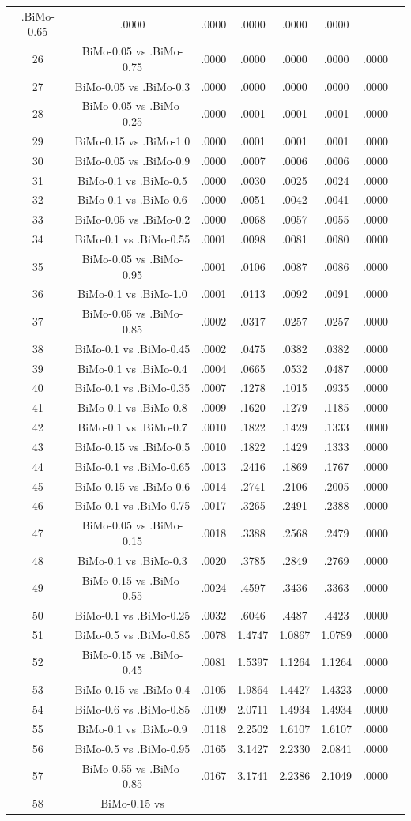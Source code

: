 \documentclass[a4paper,10pt]{article}
\begin{document}
\begin{landscape}
\begin{table}[!htp]
\begin{tabular}{cccccccc}
.BiMo-0.65&.0000&.0000&.0000&.0000&.0000\\26&BiMo-0.05 vs .BiMo-0.75&.0000&.0000&.0000&.0000&.0000\\27&BiMo-0.05 vs .BiMo-0.3&.0000&.0000&.0000&.0000&.0000\\28&BiMo-0.05 vs .BiMo-0.25&.0000&.0001&.0001&.0001&.0000\\29&BiMo-0.15 vs .BiMo-1.0&.0000&.0001&.0001&.0001&.0000\\30&BiMo-0.05 vs .BiMo-0.9&.0000&.0007&.0006&.0006&.0000\\31&BiMo-0.1 vs .BiMo-0.5&.0000&.0030&.0025&.0024&.0000\\32&BiMo-0.1 vs .BiMo-0.6&.0000&.0051&.0042&.0041&.0000\\33&BiMo-0.05 vs .BiMo-0.2&.0000&.0068&.0057&.0055&.0000\\34&BiMo-0.1 vs .BiMo-0.55&.0001&.0098&.0081&.0080&.0000\\35&BiMo-0.05 vs .BiMo-0.95&.0001&.0106&.0087&.0086&.0000\\36&BiMo-0.1 vs .BiMo-1.0&.0001&.0113&.0092&.0091&.0000\\37&BiMo-0.05 vs .BiMo-0.85&.0002&.0317&.0257&.0257&.0000\\38&BiMo-0.1 vs .BiMo-0.45&.0002&.0475&.0382&.0382&.0000\\39&BiMo-0.1 vs .BiMo-0.4&.0004&.0665&.0532&.0487&.0000\\40&BiMo-0.1 vs .BiMo-0.35&.0007&.1278&.1015&.0935&.0000\\41&BiMo-0.1 vs .BiMo-0.8&.0009&.1620&.1279&.1185&.0000\\42&BiMo-0.1 vs .BiMo-0.7&.0010&.1822&.1429&.1333&.0000\\43&BiMo-0.15 vs .BiMo-0.5&.0010&.1822&.1429&.1333&.0000\\44&BiMo-0.1 vs .BiMo-0.65&.0013&.2416&.1869&.1767&.0000\\45&BiMo-0.15 vs .BiMo-0.6&.0014&.2741&.2106&.2005&.0000\\46&BiMo-0.1 vs .BiMo-0.75&.0017&.3265&.2491&.2388&.0000\\47&BiMo-0.05 vs .BiMo-0.15&.0018&.3388&.2568&.2479&.0000\\48&BiMo-0.1 vs .BiMo-0.3&.0020&.3785&.2849&.2769&.0000\\49&BiMo-0.15 vs .BiMo-0.55&.0024&.4597&.3436&.3363&.0000\\50&BiMo-0.1 vs .BiMo-0.25&.0032&.6046&.4487&.4423&.0000\\51&BiMo-0.5 vs .BiMo-0.85&.0078&1.4747&1.0867&1.0789&.0000\\52&BiMo-0.15 vs .BiMo-0.45&.0081&1.5397&1.1264&1.1264&.0000\\53&BiMo-0.15 vs .BiMo-0.4&.0105&1.9864&1.4427&1.4323&.0000\\54&BiMo-0.6 vs .BiMo-0.85&.0109&2.0711&1.4934&1.4934&.0000\\55&BiMo-0.1 vs .BiMo-0.9&.0118&2.2502&1.6107&1.6107&.0000\\56&BiMo-0.5 vs .BiMo-0.95&.0165&3.1427&2.2330&2.0841&.0000\\57&BiMo-0.55 vs .BiMo-0.85&.0167&3.1741&2.2386&2.1049&.0000\\58&BiMo-0.15 vs 
\end{tabular}
\end{table}
\end{landscape}
\end{document}
